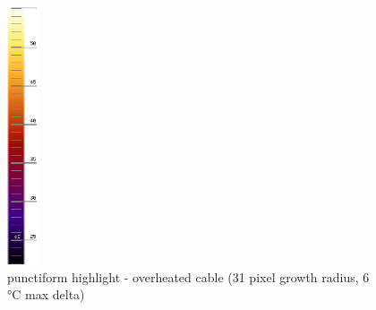 \documentclass[12pt,twoside,a4paper,titlepage]{report}
\begin{document}
\begin{figure}[ht]
 \includegraphics[width=9.5mm, keepaspectratio=true width=10cm]{img/FLIR_P60_orig_scale}
 \caption{punctiform highlight - overheated cable (31 pixel growth radius, 6 °C max delta)}
 \label{fig:tools-export-punctiform}
\end{figure}
\end{document}
